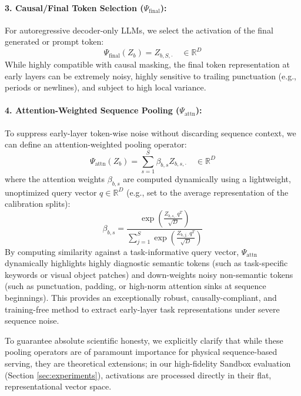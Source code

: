 \paragraph{3. Causal/Final Token Selection ($\Psi_{\text{final}}$):}
For autoregressive decoder-only LLMs, we select the activation of the final generated or prompt token:
\begin{equation}
    \Psi_{\text{final}}(Z_b) = Z_{b, S, \cdot} \quad \in \mathbb{R}^D
\end{equation}
While highly compatible with causal masking, the final token representation at early layers can be extremely noisy, highly sensitive to trailing punctuation (e.g., periods or newlines), and subject to high local variance.

\paragraph{4. Attention-Weighted Sequence Pooling ($\Psi_{\text{attn}}$):}
To suppress early-layer token-wise noise without discarding sequence context, we can define an attention-weighted pooling operator:
\begin{equation}
    \Psi_{\text{attn}}(Z_b) = \sum_{s=1}^S \beta_{b, s} Z_{b, s, \cdot} \quad \in \mathbb{R}^D
\end{equation}
where the attention weights $\beta_{b, s}$ are computed dynamically using a lightweight, unoptimized query vector $q \in \mathbb{R}^D$ (e.g., set to the average representation of the calibration splits):
\begin{equation}
    \beta_{b, s} = \frac{\exp\left( \frac{Z_{b, s, \cdot} q^T}{\sqrt{D}} \right)}{\sum_{j=1}^S \exp\left( \frac{Z_{b, j, \cdot} q^T}{\sqrt{D}} \right)}
\end{equation}
By computing similarity against a task-informative query vector, $\Psi_{\text{attn}}$ dynamically highlights highly diagnostic semantic tokens (such as task-specific keywords or visual object patches) and down-weights noisy non-semantic tokens (such as punctuation, padding, or high-norm attention sinks at sequence beginnings). This provides an exceptionally robust, causally-compliant, and training-free method to extract early-layer task representations under severe sequence noise.

To guarantee absolute scientific honesty, we explicitly clarify that while these pooling operators are of paramount importance for physical sequence-based serving, they are theoretical extensions; in our high-fidelity Sandbox evaluation (Section \ref{sec:experiments}), activations are processed directly in their flat, representational vector space.

